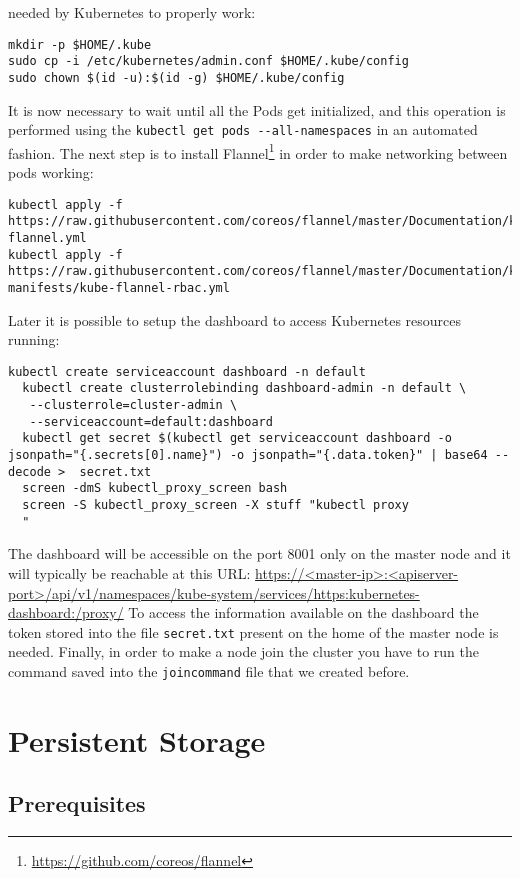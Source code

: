 needed by Kubernetes to properly work:
\begin{lstlisting}
mkdir -p $HOME/.kube
sudo cp -i /etc/kubernetes/admin.conf $HOME/.kube/config
sudo chown $(id -u):$(id -g) $HOME/.kube/config
\end{lstlisting}
It is now necessary to wait until all the Pods get initialized, and this
operation is performed using the \verb!kubectl get pods --all-namespaces! in an
automated fashion. The next step is to install
Flannel\footnote{\url{https://github.com/coreos/flannel}} in order to make
networking between pods working:
\begin{lstlisting}
kubectl apply -f https://raw.githubusercontent.com/coreos/flannel/master/Documentation/kube-flannel.yml
kubectl apply -f https://raw.githubusercontent.com/coreos/flannel/master/Documentation/k8s-manifests/kube-flannel-rbac.yml
\end{lstlisting}
Later it is possible to setup the dashboard to access Kubernetes resources
running:
\begin{lstlisting}
kubectl create serviceaccount dashboard -n default
  kubectl create clusterrolebinding dashboard-admin -n default \
   --clusterrole=cluster-admin \
   --serviceaccount=default:dashboard
  kubectl get secret $(kubectl get serviceaccount dashboard -o jsonpath="{.secrets[0].name}") -o jsonpath="{.data.token}" | base64 --decode >  secret.txt
  screen -dmS kubectl_proxy_screen bash
  screen -S kubectl_proxy_screen -X stuff "kubectl proxy
  "
\end{lstlisting}
The dashboard will be accessible on the port 8001 only on the master node and it
will typically be reachable at this URL:
\url{https://<master-ip>:<apiserver-port>/api/v1/namespaces/kube-system/services/https:kubernetes-dashboard:/proxy/}
To access the information available on the dashboard the token stored into the
file \texttt{secret.txt} present on the home of the master node is needed.
Finally, in order to make a node join the cluster you have to run the command
saved into the \texttt{joincommand} file that we created before.

\section{Persistent Storage}
\label{persistent-storage}

\subsection{Prerequisites}
\label{prerequisites}

